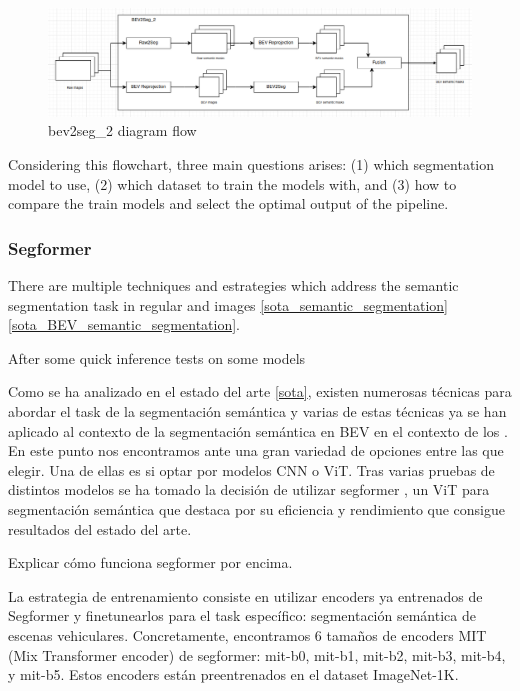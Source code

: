 \begin{figure}[h!]
    \centering
    \includegraphics[width=\linewidth]{./images/metodology/bev2seg_2_flow.png}
    \caption{bev2seg\_2 diagram flow}
    \label{fig:beg2seg_2_flow}
\end{figure}

Considering this flowchart, three main questions arises: (1) which segmentation model to use, (2) which dataset to train the models with, and (3) how to compare the train models and select the optimal output of the pipeline. 

\subsubsection{Segformer}
There are multiple techniques and estrategies which address the semantic segmentation task in regular and  images \ref{sota_semantic_segmentation} \ref{sota_BEV_semantic_segmentation}. 

After some quick inference tests on some models 


Como se ha analizado en el estado del arte \ref{sota}, existen numerosas técnicas para abordar el task de la segmentación semántica y varias de estas técnicas ya se han aplicado al contexto de la segmentación semántica en BEV en el contexto de los . En este punto nos encontramos ante una gran variedad de opciones entre las que elegir. Una de ellas es si optar por modelos CNN o ViT. Tras varias pruebas de distintos modelos \cite{dummy} \cite{dummy} \cite{dummy} se ha tomado la decisión de utilizar segformer \cite{segformer}, un ViT para segmentación semántica que destaca por su eficiencia y rendimiento que consigue resultados del estado del arte.

Explicar cómo funciona segformer por encima.

La estrategia de entrenamiento consiste en utilizar encoders ya entrenados de Segformer y finetunearlos para el task específico: segmentación semántica de escenas vehiculares. Concretamente, encontramos 6 tamaños de encoders MIT (Mix Transformer encoder) de segformer: mit-b0, mit-b1, mit-b2, mit-b3, mit-b4, y mit-b5. Estos encoders están preentrenados en el dataset ImageNet-1K.


